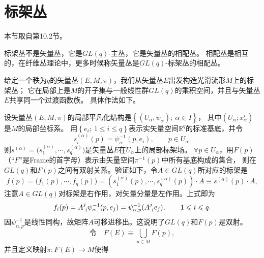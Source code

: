 
\section{标架丛}\label{chfb:sec_frame-bundles}

本节取自\parencite{chen-li-2004v2}第10.2节。

标架丛不是矢量丛，它是$GL(q)$-主丛，它是矢量丛的相配丛。
相配丛是相互的，在纤维丛理论中，更多时候称矢量丛是$GL(q)$-标架丛的相配丛。



给定一个秩为$q$的矢量丛$(E,M,\pi)$，我们从矢量丛$E$出发构造光滑流形$M$上的标架丛；
它在局部上是$M$的开子集与一般线性群$GL(q)$的乘积空间，并且与矢量丛$E$共享同一个过渡函数族。
具体作法如下。

设矢量丛$(E,M,\pi)$的局部平凡化结构是$\left\{\left(U_{\alpha}, \psi_{\alpha}\right) ;\  \alpha \in I\right\}$，
其中$\left(U_{\alpha} ; x_{\alpha}^{i}\right)$是$M$的局部坐标系。
用$\left\{e_{i} ;\ 1 \leqslant i \leqslant q\right\}$表示实矢量空间$\mathbb{R}^{q}$的标准基底，并令 
\begin{equation}
    s_{i}^{(\alpha)}(p)=\psi_{\alpha}^{-1}\left(p, e_{i}\right), \qquad p \in U_{\alpha} .
\end{equation}
则$s^{(\alpha)}=\bigl(s_{1}^{(\alpha)}, \cdots, s_{q}^{(\alpha)}\bigr)$是矢量丛$E$在$U_{\alpha}$上的局部标架场。
$\forall p \in U_{\alpha}$，用$F(p)$（“$F$”是Frame的首字母）表示由矢量空间$\pi^{-1}(p)$中所有基底构成的集合，
则在$GL(q)$和$F(p)$之间有双射关系。验证如下，令$A \in GL(q)$所对应的标架是 
\begin{equation}\label{chfb:eqn_F-comp}
    f(p)  =\bigl(f_{1}(p), \cdots, f_{q}(p)\bigr) 
    =\left(s_{1}^{(\alpha)}(p), \cdots, s_{q}^{(\alpha)}(p)\right) \cdot A \equiv s^{(\alpha)}(p) \cdot A, 
\end{equation}
注意$A \in GL(q)$对标架是右作用，对矢量分量是左作用。上式即为 
\begin{equation}\label{chfb:eqn_F-comp-expand}
    f_{i}(p)=A_{\hphantom{i}i}^{j} \psi_{\alpha}^{-1}(p, e_{j})
    =\psi_{\alpha, p}^{-1} (A_{\hphantom{i}i}^{j} e_{j}), \qquad 1 \leqslant i \leqslant q .
\end{equation}
因$\psi_{\alpha, p}^{-1}$是线性同构，故矩阵$A$可移进移出。这说明了$GL(q)$和$F(p)$是双射。
\begin{equation}\label{chfb:eqn_FE}
    \text{令}\quad  F(E)\equiv \bigcup_{p \in M} F(p) ,
\end{equation}
并且定义映射$\tilde{\pi}: F(E) \rightarrow M$使得

